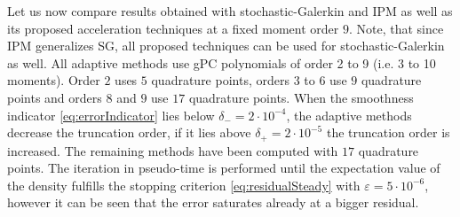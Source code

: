 Let us now compare results obtained with stochastic-Galerkin and IPM as well as its proposed acceleration techniques at a fixed moment order $9$. Note, that since IPM generalizes SG, all proposed techniques can be used for stochastic-Galerkin as well. All adaptive methods use gPC polynomials of order 2 to 9 (i.e. 3 to 10 moments). Order $2$ uses $5$ quadrature points, orders $3$ to $6$ use $9$ quadrature points and orders $8$ and $9$ use $17$ quadrature points. When the smoothness indicator \eqref{eq:errorIndicator} lies below $\delta_{-} = 2\cdot 10^{-4}$, the adaptive methods decrease the truncation order, if it lies above $\delta_{+} = 2\cdot 10^{-5}$ the truncation order is increased. The remaining methods have been computed with $17$ quadrature points. The iteration in pseudo-time is performed until the expectation value of the density fulfills the stopping criterion \eqref{eq:residualSteady} with $\varepsilon = 5\cdot 10^{-6}$, however it can be seen that the error saturates already at a bigger residual.

